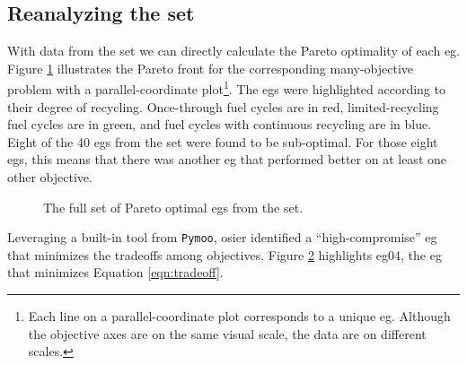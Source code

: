 \subsection{Reanalyzing the \gls{set}}

With data from the \gls{set} we can directly calculate the Pareto optimality of
each \gls{eg}. Figure \ref{fig:full-set-plot} illustrates the Pareto front for
the corresponding many-objective problem with a parallel-coordinate
plot\footnote{Each line on a parallel-coordinate plot corresponds to a unique
\gls{eg}. Although the objective axes are on the same visual scale, the data are
on different scales.}. The \glspl{eg} were highlighted according to their degree
of recycling. Once-through fuel cycles are in red, limited-recycling fuel cycles
are in green, and fuel cycles with continuous recycling are in blue. Eight of
the 40 \glspl{eg} from the \gls{set} were found to be sub-optimal. For those
eight \glspl{eg}, this means that there was another \gls{eg} that performed
better on at least one other objective.

\begin{figure}[ht!]
    \begin{center}
        \resizebox{\columnwidth}{!}{}
        \caption{The full set of Pareto optimal \glspl{eg} from the \gls{set}.}
        \label{fig:full-set-plot}
    \end{center}
\end{figure}


Leveraging a built-in tool from \texttt{Pymoo}, \gls{osier} identified a
``high-compromise'' \gls{eg} that minimizes the tradeoffs among objectives.
Figure \ref{fig:knee-solution} highlights \gls{eg}04, the \gls{eg} that
minimizes Equation \ref{eqn:tradeoff}.

\begin{figure}[ht!]
    \begin{center}
        \resizebox{\columnwidth}{!}{}
        \caption{}
        \label{fig:knee-solution}
    \end{center}
\end{figure}

